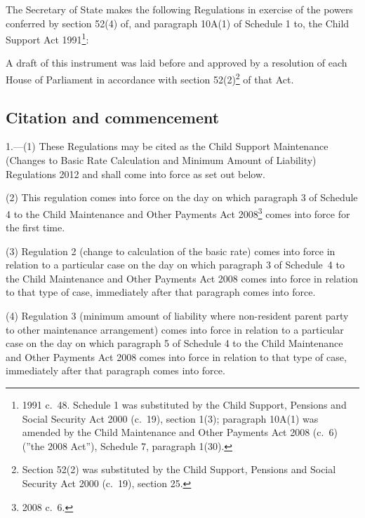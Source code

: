 \documentclass[12pt,a4paper]{article}
\title{\regstitle}
\author{S.I.\ 2012 No.\ 2678}
\date{Made
23rd October 2012\\
Coming into force
in accordance with regulation 1
}
\begin{document}
\maketitle

\enlargethispage{\baselineskip}

\noindent
The Secretary of State makes the following Regulations in exercise of the powers conferred by section 52(4) of, and paragraph 10A(1) of Schedule 1 to, the Child Support Act 1991\footnote{1991 c.~48. Schedule 1 was substituted by the Child Support, Pensions and Social Security Act 2000 (c.~19), section 1(3); paragraph 10A(1) was amended by the Child Maintenance and Other Payments Act 2008 (c.~6) (”the 2008 Act”), Schedule 7, paragraph 1(30).}:

A draft of this instrument was laid before and approved by a resolution of each House of Parliament in accordance with section 52(2)\footnote{Section 52(2) was substituted by the Child Support, Pensions and Social Security Act 2000 (c.~19), section 25.} of that Act. 

{\sloppy

\tableofcontents

}

\bigskip

\setcounter{secnumdepth}{-2}

\subsection[1. Citation and commencement]{Citation and commencement}

1.---(1)  These Regulations may be cited as the Child Support Maintenance (Changes to Basic Rate Calculation and Minimum Amount of Liability) Regulations 2012 and shall come into force as set out below.

(2) This regulation comes into force on the day on which paragraph 3 of Schedule 4 to the Child Maintenance and Other Payments Act 2008\footnote{2008 c.~6.} comes into force for the first time.

(3) Regulation 2 (change to calculation of the basic rate) comes into force in relation to a particular case on the day on which paragraph 3 of Schedule~4 to the Child Maintenance and Other Payments Act 2008 comes into force in relation to that type of case, immediately after that paragraph comes into force.

(4) Regulation 3 (minimum amount of liability where non-resident parent party to other maintenance arrangement) comes into force in relation to a particular case on the day on which paragraph 5 of Schedule 4 to the Child Maintenance and Other Payments Act 2008 comes into force in relation to that type of case, immediately after that paragraph comes into force.
\end{document}
